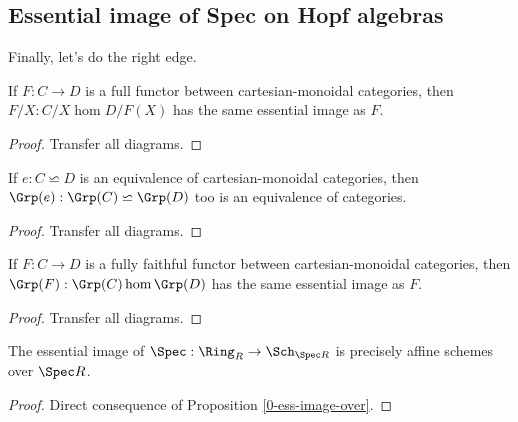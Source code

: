 \subsection{Essential image of Spec on Hopf algebras}


Finally, let's do the right edge.


\begin{proposition}
  \label{0-ess-image-over}
  \uses{}
  \leanok

  If $F : C \to D$ is a full functor between cartesian-monoidal categories, then $F / X : C / X \hom D / F(X)$ has the same essential image as $F$.
\end{proposition}
\begin{proof}
  \uses{}
  \leanok

  Transfer all diagrams.
\end{proof}


\begin{proposition}
  \label{0-grp-equiv}
  \uses{}
  \leanok

  If $e : C \backsimeq D$ is an equivalence of cartesian-monoidal categories, then $\Grp(e) : \Grp(C) \backsimeq \Grp(D)$ too is an equivalence of categories.
\end{proposition}
\begin{proof}
  \uses{}
  \leanok

  Transfer all diagrams.
\end{proof}


\begin{proposition}
  \label{0-ess-image-grp}
  \uses{}
  \leanok

  If $F : C \to D$ is a fully faithful functor between cartesian-monoidal categories, then $\Grp(F) : \Grp(C) \hom \Grp(D)$ has the same essential image as $F$.
\end{proposition}
\begin{proof}

  Transfer all diagrams.
\end{proof}


\begin{proposition}
  \label{0-ess-image-spec-alg}
  \leanok

  The essential image of $\Spec : \Ring_R \to \Sch_{\Spec R}$ is precisely affine schemes over $\Spec R$.
\end{proposition}
\begin{proof}
  \leanok

  Direct consequence of Proposition \ref{0-ess-image-over}.
\end{proof}


